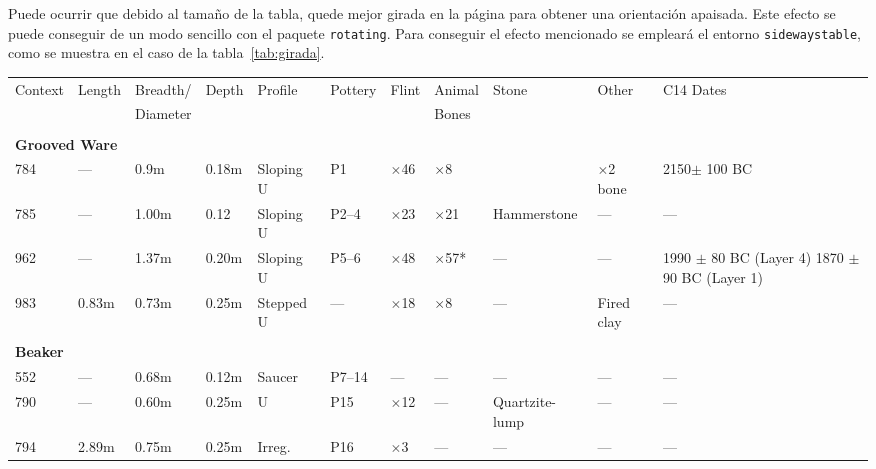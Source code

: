 \documentclass[11pt,a4paper]{article}
\begin{document}
Puede ocurrir que debido al tamaño de la tabla, quede mejor girada en la página para obtener una orientación apaisada. Este efecto se puede conseguir de un modo sencillo con el paquete \texttt{rotating}. Para conseguir el efecto mencionado se empleará el entorno \texttt{sidewaystable}, como se muestra en el caso de la tabla~\ref{tab:girada}.
\begin{sidewaystable}
	\centering
	\caption[Ejemplo de tabla girada]{Tabla girada en una página}\label{tab:girada}
	\begin{tabular}{llllllllp{1in}lp{1in}}
		\toprule
		Context   &Length   &Breadth/   &Depth   &Profile   &Pottery   &Flint   &Animal   &Stone   &Other    &C14 Dates \\
		&         &Diameter   &        &          &          &        & 
		Bones&&&\\
		\midrule
		&&&&&&&&&&\\
		\multicolumn{10}{l}{\bf Grooved Ware}&\\
		784       &---        &0.9m       &0.18m   &Sloping U &P1       &$\times$46  &  $\times$8      &&       $\times$2 bone&  2150$\pm$ 100 BC\\
		785       &---        &1.00m      &0.12    &Sloping U &P2--4    &$\times$23  &  $\times$21     & Hammerstone &---&---\\
		962       &---        &1.37m      &0.20m   &Sloping U &P5--6    &$\times$48  &  $\times$57*    & ---&     ---&1990 $\pm$ 80 BC (Layer 4) 1870 $\pm$90 BC (Layer 1)\\
		983       &0.83m      &0.73m      &0.25m   &Stepped U &---      &$\times$18  &  $\times$8      & ---& Fired clay&---\\
		&&&&&&&&&&\\
		\multicolumn{10}{l}{\bf Beaker}&\\
		552       &---        &0.68m      &0.12m   &Saucer    &P7--14   &---           & ---       & ---       &---        &---\\
		790       &---        &0.60m      &0.25m   &U         &P15      &$\times$12    & ---       & Quartzite-lump&---    &---\\
		794       &2.89m      &0.75m      &0.25m   &Irreg.    &P16      &$\times$3     & ---       & ---       &---        &---\\
		\bottomrule
	\end{tabular}
\end{sidewaystable}
\end{document}
